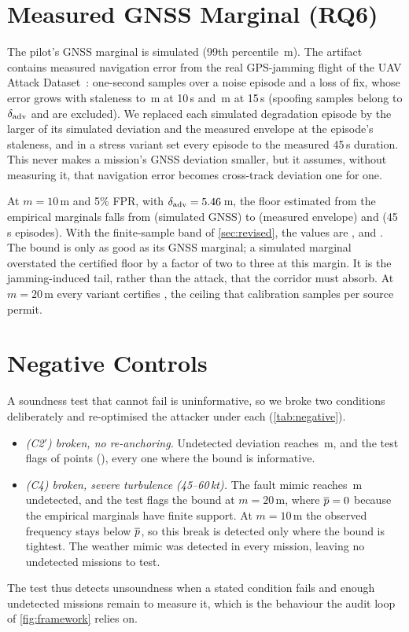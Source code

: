 \section{Measured GNSS Marginal (RQ6)}
\label{sec:r5}
The pilot's GNSS marginal is simulated (99th percentile \nRFivePnnSim\,m). The
artifact contains measured navigation error from the real GPS-jamming flight of
the UAV Attack Dataset~\cite{whelan2020dataset}: \nRFiveSamples{} one-second
samples over a noise episode and a loss of fix, whose error grows with staleness
to \nRFiveEnvTen\,m at 10\,s and \nRFiveEnvMax\,m at 15\,s (spoofing samples
belong to $\delta_{\mathrm{adv}}$ and are excluded). We replaced each simulated degradation
episode by the larger of its simulated deviation and the measured envelope at the
episode's staleness, and in a stress variant set every episode to the measured
45\,s duration. This never makes a mission's GNSS deviation smaller, but it
assumes, without measuring it, that navigation error becomes cross-track
deviation one for one.

At $m=10$\,m and 5\% FPR, with $\delta_{\mathrm{adv}}=5.46$\,m, the floor estimated from
the empirical marginals falls from \nRFiveFloorSim{} (simulated GNSS) to
\nRFiveFloorMeas{} (measured envelope) and \nRFiveFloorLong{} (45\,s episodes).
With the finite-sample band of \cref{sec:revised}, the values are
\nRFiveFloorCpSim, \nRFiveFloorCpMeas{} and \nRFiveFloorCpLong. The bound is only
as good as its GNSS marginal; a simulated marginal overstated the certified
floor by a factor of two to three at this margin. It is the jamming-induced
tail, rather than the attack, that the corridor must absorb. At $m=20$\,m every variant
certifies \nRFiveFloorCpTwenty, the ceiling that \nCalMissions{} calibration
samples per source permit.

\section{Negative Controls}
\label{app:negative}
A soundness test that cannot fail is uninformative, so we broke two conditions
deliberately and re-optimised the attacker under each (\cref{tab:negative}).
\begin{itemize}
\item \emph{(C2$'$) broken, no re-anchoring.} Undetected deviation reaches
  \nNegCtwoMaxDev\,m, and the test flags \nNegCtwoViol{} of \nNegCtwoRows{}
  points (\nNegCtwoViolFam{}), every one where the bound is informative.
\item \emph{(C4) broken, severe turbulence (45--60\,kt).} The fault mimic
  reaches \nNegCfourMaxDev\,m undetected, and the test flags the bound at
  $m=20$\,m, where $\overline{p}=0$ because the empirical marginals have finite
  support. At $m=10$\,m the observed frequency stays below $\overline{p}$, so this
  break is detected only where the bound is tightest. The weather mimic was
  detected in every mission, leaving no undetected missions to test.
\end{itemize}
The test thus detects unsoundness when a stated condition fails and enough
undetected missions remain to measure it, which is the behaviour the audit
loop of \cref{fig:framework} relies on.

